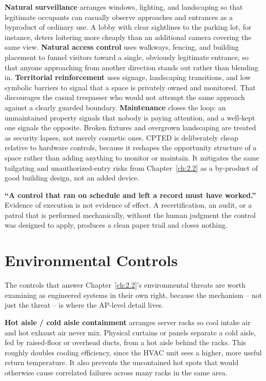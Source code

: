 \textbf{Natural surveillance} arranges windows, lighting, and landscaping so that legitimate
occupants can casually observe approaches and entrances as a byproduct of ordinary use. A lobby
with clear sightlines to the parking lot, for instance, deters loitering more cheaply than an
additional camera covering the same view. \textbf{Natural access control} uses walkways, fencing, and building
placement to funnel visitors toward a single, obviously legitimate entrance, so that anyone
approaching from another direction stands out rather than blending in. \textbf{Territorial
reinforcement} uses signage, landscaping transitions, and low symbolic barriers to signal that a
space is privately owned and monitored. That discourages the casual trespasser who would not
attempt the same approach against a clearly guarded boundary. \textbf{Maintenance} closes the
loop: an unmaintained property signals that nobody is paying attention, and a well-kept one
signals the opposite. Broken fixtures and overgrown landscaping are treated as security lapses,
not merely cosmetic ones. CPTED is deliberately cheap relative to hardware controls, because it
reshapes the opportunity structure of a space rather than adding anything to monitor or maintain.
It mitigates the same tailgating and unauthorized-entry risks from Chapter~\ref{ch:2.2} as a
by-product of good building design, not an added device.

\begin{misconception}
\textbf{``A control that ran on schedule and left a record must have worked.''} Evidence of
execution is not evidence of effect. A recertification, an audit, or a patrol that is performed
mechanically, without the human judgment the control was designed to apply, produces a clean paper
trail and closes nothing.
\end{misconception}

\section{Environmental Controls}

The controls that answer Chapter~\ref{ch:2.2}'s environmental threats are worth examining as
engineered systems in their own right, because the mechanism -- not just the threat -- is where the
AP-level detail lives.

\textbf{Hot aisle / cold aisle containment} arranges server racks so cool intake air and hot
exhaust air never mix. Physical curtains or panels separate a cold aisle, fed by raised-floor or
overhead ducts, from a hot aisle behind the racks. This roughly doubles cooling efficiency, since
the HVAC unit sees a higher, more useful return temperature. It also prevents the uncontained hot
spots that would otherwise cause correlated failures across many racks in the same area.

